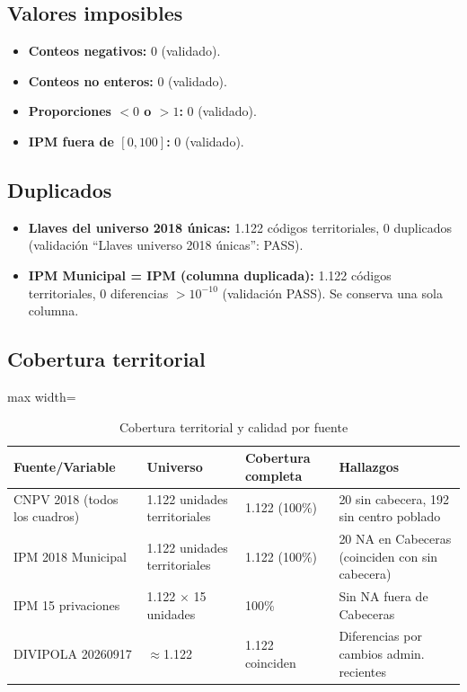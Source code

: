 \subsection{Valores imposibles}
\label{sec:valores_imposibles}

\begin{itemize}
    \item \textbf{Conteos negativos:} 0 (validado).
    \item \textbf{Conteos no enteros:} 0 (validado).
    \item \textbf{Proporciones $<0$ o $>1$:} 0 (validado).
    \item \textbf{IPM fuera de $[0,100]$:} 0 (validado).
\end{itemize}

\subsection{Duplicados}
\label{sec:duplicados}

\begin{itemize}
    \item \textbf{Llaves del universo 2018 únicas:} 1.122 códigos territoriales, 0 duplicados (validación ``Llaves universo 2018 únicas'': PASS).
    \item \textbf{IPM Municipal = IPM (columna duplicada):} 1.122 códigos territoriales, 0 diferencias $>10^{-10}$ (validación PASS). Se conserva una sola columna.
\end{itemize}

\subsection{Cobertura territorial}
\label{sec:cobertura_territorial_calidad}

\begin{table}[htbp]
\centering
\caption{Cobertura territorial y calidad por fuente}
\label{tab:cobertura_calidad}
\begin{adjustbox}{max width=\textwidth}
\begin{tabular}{@{}llll@{}}
\toprule
\textbf{Fuente/Variable} & \textbf{Universo} & \textbf{Cobertura completa} & \textbf{Hallazgos} \\
\midrule
CNPV 2018 (todos los cuadros) & 1.122 unidades territoriales & 1.122 (100\%) & 20 sin cabecera, 192 sin centro poblado \\
IPM 2018 Municipal & 1.122 unidades territoriales & 1.122 (100\%) & 20 NA en Cabeceras (coinciden con sin cabecera) \\
IPM 15 privaciones & 1.122 $\times$ 15 unidades & 100\% & Sin NA fuera de Cabeceras \\
DIVIPOLA 20260917 & $\approx$1.122 & 1.122 coinciden & Diferencias por cambios admin. recientes \\
\bottomrule
\end{tabular}
\end{adjustbox}
\end{table}

